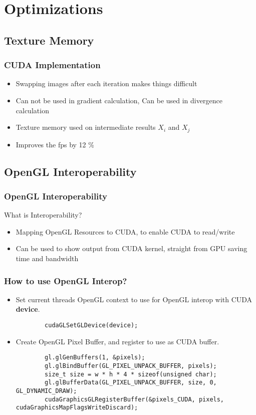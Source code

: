 \documentclass{beamer}
\begin{document}
\section{Optimizations}


\subsection{Texture Memory}

\begin{frame}
  \frametitle{CUDA Implementation}
  \begin{itemize}
  \item Swapping images after each iteration makes things difficult

  \item Can not be used in gradient calculation, Can be used in divergence calculation

  \item Texture memory used on intermediate results $ X_i $ and $ X_j $
  
  \item Improves the fps by 12 \%
  
  \end{itemize}

\end{frame}

\subsection{OpenGL Interoperability}

\begin{frame}
\frametitle{OpenGL Interoperability}
What is Interoperability?
\begin{itemize}
	\item Mapping OpenGL Resources to CUDA, to enable CUDA to read/write
	\item Can be used to show output from CUDA kernel, straight from GPU saving time and bandwidth
\end{itemize}
\end{frame}


\begin{frame}[fragile]
	\frametitle{How to use OpenGL Interop?}
	\begin{itemize}
		\item Set current threads OpenGL context to use for OpenGL interop with CUDA \textbf{device}.
		\begin{lstlisting}
		cudaGLSetGLDevice(device);
		\end{lstlisting}
		\item Create OpenGL Pixel Buffer, and register to use as CUDA buffer.
		\begin{lstlisting}
		gl.glGenBuffers(1, &pixels);
		gl.glBindBuffer(GL_PIXEL_UNPACK_BUFFER, pixels);
		size_t size = w * h * 4 * sizeof(unsigned char);
		gl.glBufferData(GL_PIXEL_UNPACK_BUFFER, size, 0, GL_DYNAMIC_DRAW);
		cudaGraphicsGLRegisterBuffer(&pixels_CUDA, pixels, cudaGraphicsMapFlagsWriteDiscard);
		\end{lstlisting}
	\end{itemize}
\end{frame}
\end{document}
